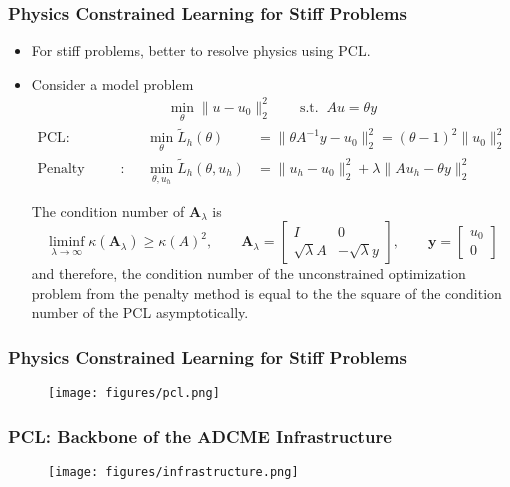\documentclass[usenames,dvipsnames]{beamer}
\begin{document}
\begin{frame}
	\frametitle{Physics Constrained Learning for Stiff Problems}
	
	\begin{itemize}
		\item For stiff problems, better to resolve physics using PCL.
		\item Consider a model problem 
		\begin{gather*}
			\min_{\theta} \|u-u_0\|^2_2 \qquad \text{s.t.} \;\; Au = \theta y
		\end{gather*}
	\vspace{-0.5cm}
	\begin{align*}
		\text{PCL}: &&\ \min_\theta \tilde L_h(\theta) &= \|\theta A^{-1} y - u_0\|^2_2 = (\theta-1)^2\|u_0\|_2^2\\
				\text{Penalty Method}: &&\ 
			\min_{\theta, u_h}\tilde L_h(\theta, u_h) &= \|u_h-u_0\|^2_2 + \lambda \|Au_h -\theta y\|_2^2
	\end{align*}
\begin{theorem}
	The condition number of $\mathbf{A}_\lambda$ is 
	\begin{equation*}
		\liminf_{\lambda\rightarrow \infty}\kappa(\mathbf{A}_\lambda)  \geq  \kappa(A)^2,\qquad \mathbf{A}_\lambda = \begin{bmatrix}
			I & 0\\
			\sqrt{\lambda}A & -\sqrt{\lambda}y
		\end{bmatrix}, \qquad 
		\mathbf{y} = \begin{bmatrix}
			u_0\\ 0
		\end{bmatrix}
	\end{equation*}
	and therefore, the condition number of the unconstrained optimization problem from the penalty method is equal to the the square of the condition number of the PCL asymptotically. 
\end{theorem}
 	\end{itemize}
\end{frame}

\begin{frame}
	\frametitle{Physics Constrained Learning for Stiff Problems}
	\begin{figure}[hbt]
		\centering
		\texttt{[image: figures/pcl.png]}
	\end{figure}
\end{frame}



\begin{frame}
	\frametitle{PCL: Backbone of the ADCME Infrastructure}
	
	
	\begin{figure}[hbt]
		\centering
		\texttt{[image: figures/infrastructure.png]}
	\end{figure}
\end{frame}
\end{document}
